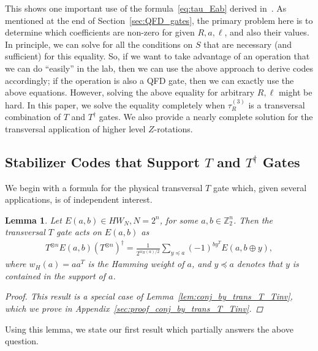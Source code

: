 \documentclass[twoside,romanappendices]{IEEEtran}
\newtheorem{lemma}[theorem]{Lemma}
\begin{document}
This shows one important use of the formula~\eqref{eq:tau_Eab} derived in~\cite{Rengaswamy-pra19}.
As mentioned at the end of Section~\ref{sec:QFD_gates}, the primary problem here is to determine which coefficients are non-zero for given $R,a,\ell$, and also their values.
In principle, we can solve for all the conditions on $S$ that are necessary (and sufficient) for this equality. 
So, if we want to take advantage of an operation that we can do ``easily'' in the lab, then we can use the above approach to derive codes accordingly; if the operation is also a QFD gate, then we can exactly use the above equations. 
However, solving the above equality for arbitrary $R,\ell$ might be hard.
In this paper, we solve the equality completely when $\tau_R^{(3)}$ is a transversal combination of $T$ and $T^{\dagger}$ gates. 
We also provide a nearly complete solution for the transversal application of higher level $Z$-rotations.


\subsection{Stabilizer Codes that Support $T$ and $T^{\dagger}$ Gates}
\label{sec:stab_codes_T_Tinv}


We begin with a formula for the physical transversal $T$ gate which, given several applications, is of independent interest. %


\begin{lemma}
\label{lem:conj_by_trans_T}
Let $E(a,b) \in HW_N, N = 2^n$, for some $a,b \in \mathbb{Z}_2^n$.
Then the transversal $T$ gate acts on $E(a,b)$ as
\begin{align}
T^{\otimes n} E(a,b) \left( T^{\otimes n} \right)^{\dagger} = \frac{1}{2^{w_H(a)/2}} \sum_{y \preceq a} (-1)^{b y^T} E(a, b \oplus y),
\end{align}
where $w_H(a) = aa^T$ is the Hamming weight of $a$, and $y \preceq a$ denotes that $y$ is contained in the support of $a$.
\begin{proof}
This result is a special case of Lemma~\ref{lem:conj_by_trans_T_Tinv}, which we prove in Appendix~\ref{sec:proof_conj_by_trans_T_Tinv}.
\end{proof}
\end{lemma}


Using this lemma, we state our first result which partially answers the above question.
\end{document}

